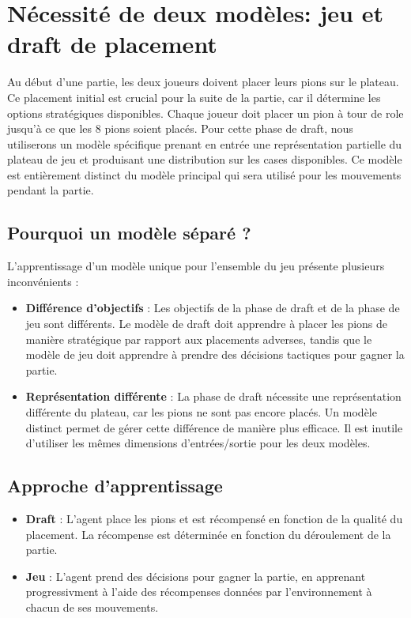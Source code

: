 \documentclass[]{article}
\begin{document}
\section{Nécessité de deux modèles: jeu et draft de placement}
Au début d'une partie, les deux joueurs doivent placer leurs pions sur le plateau. Ce placement initial est crucial pour la suite de la partie, car il détermine les options stratégiques disponibles. Chaque joueur doit placer un pion à tour de role jusqu'à ce que les 8 pions soient placés. Pour cette phase de draft, nous utiliserons un modèle spécifique prenant en entrée une représentation partielle du plateau de jeu et produisant une distribution sur les cases disponibles. Ce modèle est entièrement distinct du modèle principal qui sera utilisé pour les mouvements pendant la partie.

\subsection{Pourquoi un modèle séparé ?}
L'apprentissage d'un modèle unique pour l'ensemble du jeu présente plusieurs inconvénients :
\begin{itemize}
    \item \textbf{Différence d'objectifs} : Les objectifs de la phase de draft et de la phase de jeu sont différents. Le modèle de draft doit apprendre à placer les pions de manière stratégique par rapport aux placements adverses, tandis que le modèle de jeu doit apprendre à prendre des décisions tactiques pour gagner la partie.
    \item \textbf{Représentation différente} : La phase de draft nécessite une représentation différente du plateau, car les pions ne sont pas encore placés. Un modèle distinct permet de gérer cette différence de manière plus efficace. Il est inutile d'utiliser les mêmes dimensions d'entrées/sortie pour les deux modèles.
\end{itemize}

\subsection{Approche d'apprentissage}
\begin{itemize}
    \item \textbf{Draft} : L'agent place les pions et est récompensé en fonction de la qualité du placement. La récompense est déterminée en fonction du déroulement de la partie.
    \item \textbf{Jeu} : L'agent prend des décisions pour gagner la partie, en apprenant progressivment à l'aide des récompenses données par l'environnement à chacun de ses mouvements.
\end{itemize}
\end{document}
